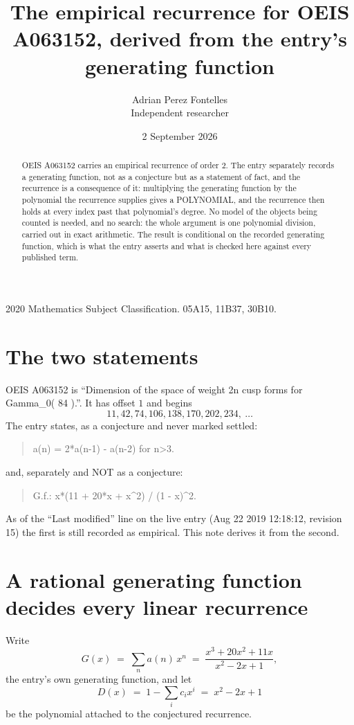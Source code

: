 \documentclass[11pt,a4paper]{article}
\title{The empirical recurrence for OEIS A063152, derived from the entry's generating function}
\author{Adrian Perez Fontelles\\ \small Independent researcher}
\date{2 September 2026}
\theoremstyle{plain}
\theoremstyle{definition}
\begin{document}
\maketitle

\begin{abstract}
OEIS A063152 carries an empirical recurrence of order $2$. The entry separately records a
generating function, not as a conjecture but as a statement of fact, and the recurrence is a
consequence of it: multiplying the generating function by the polynomial the recurrence
supplies gives a POLYNOMIAL, and the recurrence then holds at every index past that
polynomial's degree. No model of the objects being counted is needed, and no search: the
whole argument is one polynomial division, carried out in exact arithmetic. The result is
conditional on the recorded generating function, which is what the entry asserts and what is
checked here against every published term.
\end{abstract}

\noindent\small 2020 Mathematics Subject Classification. 05A15, 11B37, 30B10.\normalsize

\section{The two statements}

OEIS A063152 is ``Dimension of the space of weight 2n cusp forms for Gamma\_0( 84 ).''. It has offset $1$ and begins
\[
11, 42, 74, 106, 138, 170, 202, 234,\ \dots
\]
The entry states, as a conjecture and never marked settled:
\begin{quote}
a(n) = 2*a(n-1) - a(n-2) for n>3.
\end{quote}
and, separately and NOT as a conjecture:
\begin{quote}
G.f.: x*(11 + 20*x + x\^{}2) / (1 - x)\^{}2.
\end{quote}
As of the ``Last modified'' line on the live entry (Aug 22 2019 12:18:12, revision 15) the first is still
recorded as empirical. This note derives it from the second.

\section{A rational generating function decides every linear recurrence}

Write
\[
G(x)\;=\;\sum_{n}a(n)\,x^{n}\;=\;\frac{x^{3} + 20 x^{2} + 11 x}{x^{2} - 2 x + 1},
\]
the entry's own generating function, and let
\[
D(x)\;=\;1-\sum_i c_i x^{i}\;=\;x^{2} - 2 x + 1
\]
be the polynomial attached to the conjectured recurrence.
\end{document}
